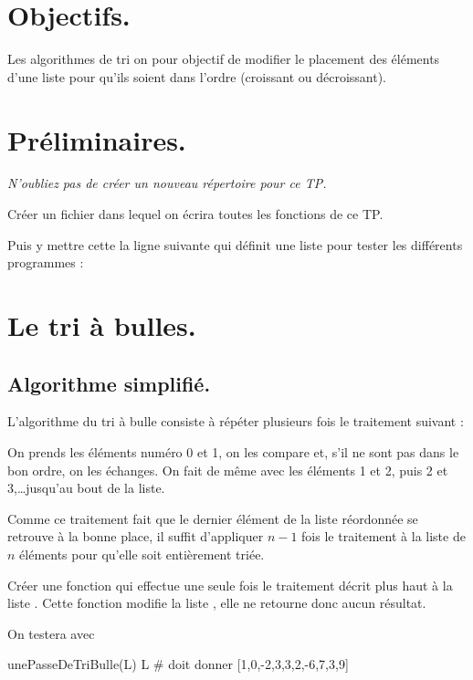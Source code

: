 \documentclass[french,12pt,twoside]{VcCours}
\begin{document}

\tableofcontents
\separationTitre

\vspace{2cm}
\section*{Objectifs.}
Les algorithmes de tri on pour objectif de modifier le placement des éléments 
d'une liste pour qu'ils soient dans l'ordre (croissant ou décroissant).

\section*{Préliminaires.}

\emph{N'oubliez pas de créer un nouveau répertoire pour ce TP.}

\begin{Exercice}
Créer un fichier  dans lequel on écrira toutes les fonctions de ce
TP.

Puis y mettre cette la ligne suivante qui définit une liste  pour tester
les différents programmes :

\end{Exercice}


\newpage
\section{Le tri à bulles.}
\subsection{Algorithme simplifié.}
L'algorithme du tri à bulle consiste à répéter plusieurs fois le traitement 
suivant :

On prends les éléments numéro 0 et 1, on les compare et, s'il ne sont pas dans 
le bon ordre, on les échanges. On fait de même avec les éléments 1 et 2, 
puis 2 et 3,\ldots jusqu'au bout de la liste.

Comme ce traitement fait que le dernier élément de la liste réordonnée se 
retrouve à la bonne place, il suffit d'appliquer $n-1$ fois le traitement 
à la liste de $n$ éléments pour qu'elle soit entièrement triée.

\begin{Exercice}
Créer une fonction  qui effectue une seule fois le 
traitement décrit plus haut à la liste . Cette fonction modifie la liste 
, elle ne retourne donc aucun résultat.

On testera avec 
\end{Exercice}
\begin{Python}
unePasseDeTriBulle(L)
L # doit donner [1,0,-2,3,3,2,-6,7,3,9]
\end{Python}
\end{document}
